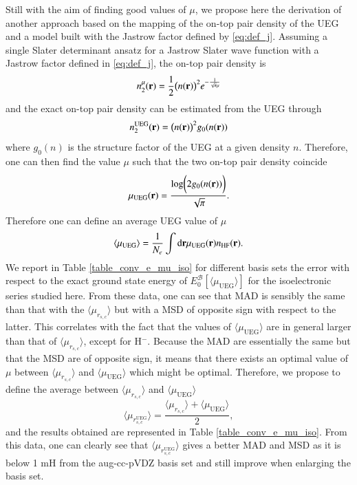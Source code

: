 \documentclass[aip,jcp,reprint,noshowkeys,superscriptaddress]{revtex4-1}
\newcommand{\basis}[0]{\mathcal{B}}
\newcommand{\muueg}{\mu_{\text{UEG}}}
\newcommand{\muuegav}{\langle \mu_{\text{UEG}}\rangle}
\newcommand{\murscav}{\langle \mu_{r_{s,c}}\rangle}
\newcommand{\mursclda}{\langle \mu_{r_{s,c}^{\text{UEG}}}\rangle}
\begin{document}
Still with the aim of finding good values of $\mu$, we propose here the derivation of another approach based on the mapping of the on-top pair density of the UEG and a model built with the Jastrow factor defined by \eqref{eq:def_j}. 
Assuming a single Slater determinant ansatz for a Jastrow Slater wave function with a Jastrow factor defined in \eqref{eq:def_j}, the on-top pair density is 
\begin{equation}
 n_2^\mu({\bf r}) = \frac{1}{2}\big(n({\bf r})\big)^2 e^{-\frac{1}{\sqrt{\pi}\mu}}
\end{equation}
and the exact on-top pair density can be estimated from the UEG through 
\begin{equation}
 n_2^{\text{UEG}}({\bf r}) = \big(n({\bf r})\big)^2g_0(n({\bf r}))
\end{equation}
where $g_0( n)$ is the structure factor of the UEG at a given density $n$. 
Therefore, one can then find the value $\mu$ such that the two on-top pair density coincide
\begin{equation}
 \muueg({\bf r}) = \frac{\text{log}\bigg(2 g_0(n({\bf r}))\bigg) }{\sqrt{\pi}}.
\end{equation}
Therefore one can define an average UEG value of $\mu$ 
\begin{equation}
 \label{eq:mu_av_ueg}
 \muuegav = \frac{1}{N_e}\int \text{d}{\bf r} \muueg({\bf r}) n_{\text{HF}}({\bf r}).
\end{equation}
We report in Table \ref{table_conv_e_mu_iso} for different basis sets the error with respect to the exact ground state energy of $E_0^{\basis}[\muuegav]$ for the isoelectronic series studied here. 
From these data, one can see that MAD is sensibly the same than that with the $\murscav$ but with a MSD of opposite sign with respect to the latter. This correlates with the fact that the values of $\muuegav$ are in general larger than that of $\murscav$, except for H$^-$. 
Because the MAD are essentially the same but that the MSD are of opposite sign, it means that there exists an optimal value of $\mu$ between $\murscav$ and $\muuegav$ which might be optimal. 
Therefore, we propose to define the average between $\murscav$ and $\muuegav$ 
\begin{equation}
 \label{eq:mu_av_ueg_rsc}
  \mursclda = \frac{\murscav   +   \muuegav }{2},
\end{equation}
and the results obtained are represented in Table \ref{table_conv_e_mu_iso}. From this data, one can clearly see that $\mursclda$ gives a better MAD and MSD as it is below 1 mH from the aug-cc-pVDZ basis set and still improve when enlarging the basis set. 
\end{document}
